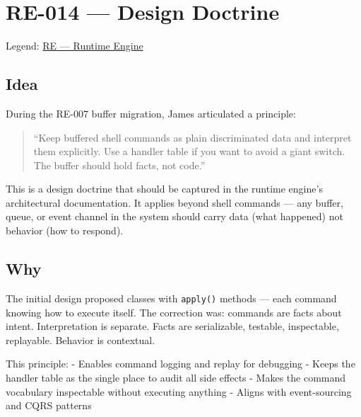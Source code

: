 \chapter{RE-014 ---  Design Doctrine}\label{record-365}

\smallskip

Legend: \href{https://github.com/flyingrobots/bijou/blob/cbd70612140e7a450d764b3c7be1c6af878b99bc/docs/method/graveyard/legends/RE-runtime-engine.md}{RE --- Runtime Engine}

\section{Idea}\label{record-365-idea}

During the RE-007 buffer migration, James articulated a principle:

\begin{quote}
``Keep buffered shell commands as plain discriminated data and interpret them explicitly. Use a handler table if you want to avoid a giant switch. The buffer should hold facts, not code.''
\end{quote}

This is a design doctrine that should be captured in the runtime engine's architectural documentation. It applies beyond shell commands --- any buffer, queue, or event channel in the system should carry data (what happened) not behavior (how to respond).

\section{Why}\label{record-365-why}

The initial design proposed classes with \texttt{a\allowbreak{}p\allowbreak{}p\allowbreak{}l\allowbreak{}y\allowbreak{}(\allowbreak{})} methods --- each command knowing how to execute itself. The correction was: commands are facts about intent. Interpretation is separate. Facts are serializable, testable, inspectable, replayable. Behavior is contextual.

This principle: - Enables command logging and replay for debugging - Keeps the handler table as the single place to audit all side effects - Makes the command vocabulary inspectable without executing anything - Aligns with event-sourcing and CQRS patterns

